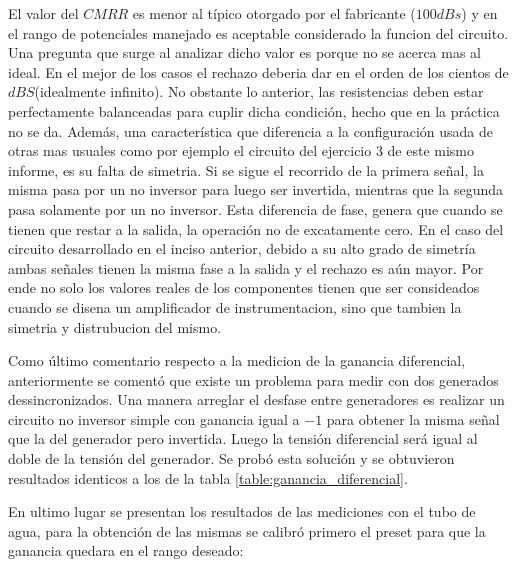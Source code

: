 El valor del $CMRR$ es menor al t\'ipico otorgado por el fabricante ($100dBs$) y en el rango de potenciales manejado es aceptable considerado la funcion del circuito. Una pregunta que surge al analizar dicho valor es porque no se acerca mas al ideal. En el mejor de los casos el rechazo deberia dar en el orden de los cientos de $dBS$(idealmente infinito). No obstante lo anterior, las resistencias deben estar perfectamente balanceadas para cuplir dicha condici\'on, hecho que en la pr\'actica no se da. Adem\'as, una caracter\'istica que diferencia a la configuraci\'on usada de otras mas usuales como por ejemplo el circuito del ejercicio 3 de este mismo informe, es su falta de simetria. Si se sigue el recorrido de la primera señal, la misma pasa por un no inversor para luego ser invertida, mientras que la segunda pasa solamente por un no inversor. Esta diferencia de fase, genera que cuando se tienen que restar a la salida, la operaci\'on no de excatamente cero. En el caso del circuito desarrollado en el inciso anterior, debido a su alto grado de simetr\'ia ambas señales tienen la misma fase a la salida y el rechazo es a\'un mayor. Por ende no solo los valores reales de los componentes tienen que ser consideados cuando se disena un amplificador de instrumentacion, sino que tambien la simetria y distrubucion del mismo. 


Como último comentario respecto a la medicion de la ganancia diferencial, anteriormente se comentó que existe un problema para medir con dos generados dessincronizados. Una manera arreglar el desfase entre generadores es realizar un circuito no inversor simple con ganancia igual a $-1$ para obtener la misma señal que la del generador pero invertida. Luego la tensi\'on diferencial ser\'a igual al doble de la tensi\'on del generador. Se prob\'o esta soluci\'on y se obtuvieron resultados identicos a los de la tabla \ref{table:ganancia_diferencial}.

En ultimo lugar se presentan los resultados de las mediciones con el tubo de agua, para la obtenci\'on de las mismas se calibr\'o primero el preset para que la ganancia quedara en el rango deseado:

